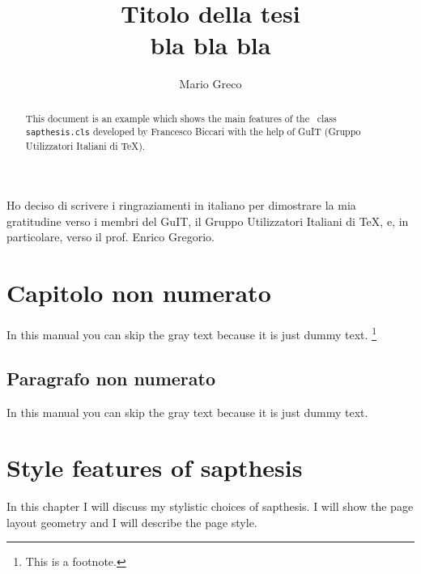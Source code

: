 \documentclass[LaM,binding=0.6cm]{sapthesis}
\title{Titolo della tesi \\ bla bla bla}
\author{Mario Greco}
\begin{document}
\frontmatter

\maketitle

\dedication{Dedicato a\\ Donald Knuth}

\begin{abstract}
This document is an example which shows the main features of
the \LaTeXe\ class \texttt{sapthesis.cls} developed by Francesco Biccari
with the help of GuIT (Gruppo Utilizzatori Italiani di \TeX).
\end{abstract}

\begin{acknowledgments}
Ho deciso di scrivere i ringraziamenti in italiano
per dimostrare la mia gratitudine verso i membri
del GuIT, il Gruppo Utilizzatori Italiani di \TeX, e, in particolare,
verso il prof. Enrico Gregorio.
\end{acknowledgments}

\tableofcontents

\chapter{Capitolo non numerato}

In this manual you can skip the gray text because it is just dummy text.%
\footnote{This is a footnote.}

\textcolor{gray}{\lipsum[1-22]}


\section*{Paragrafo non numerato}

In this manual you can skip the gray text because it is just dummy text.

\textcolor{gray}{\lipsum[1-22]}




\mainmatter

\chapter{Style features of \textsf{sapthesis}}

In this chapter I will discuss my stylistic choices of \textsf{sapthesis}.
I will show the page layout geometry and I will describe the page style.
\end{document}
